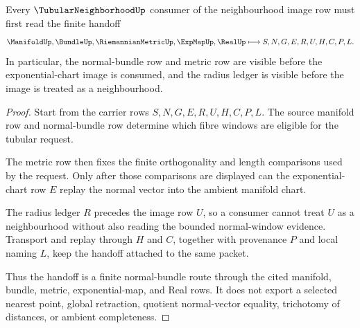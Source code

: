 \begin{theorem}
\label{thm:tubular-neighborhood-normal-bundle-handoff}
Every $\TubularNeighborhoodUp$ consumer of the neighbourhood image row must first read the finite handoff
$$
\ManifoldUp,\BundleUp,\RiemannianMetricUp,\ExpMapUp,\RealUp
\longmapsto
S,N,G,E,R,U,H,C,P,L .
$$
In particular, the normal-bundle row and metric row are visible before the exponential-chart image is consumed, and the radius ledger is visible before the image is treated as a neighbourhood.
\end{theorem}
\begin{proof}
Start from the carrier rows $S,N,G,E,R,U,H,C,P,L$. The source manifold row and normal-bundle row determine which fibre windows are eligible for the tubular request.

The metric row then fixes the finite orthogonality and length comparisons used by the request. Only after those comparisons are displayed can the exponential-chart row $E$ replay the normal vector into the ambient manifold chart.

The radius ledger $R$ precedes the image row $U$, so a consumer cannot treat $U$ as a neighbourhood without also reading the bounded normal-window evidence. Transport and replay through $H$ and $C$, together with provenance $P$ and local naming $L$, keep the handoff attached to the same packet.

Thus the handoff is a finite normal-bundle route through the cited manifold, bundle, metric, exponential-map, and Real rows. It does not export a selected nearest point, global retraction, quotient normal-vector equality, trichotomy of distances, or ambient completeness.
\end{proof}




